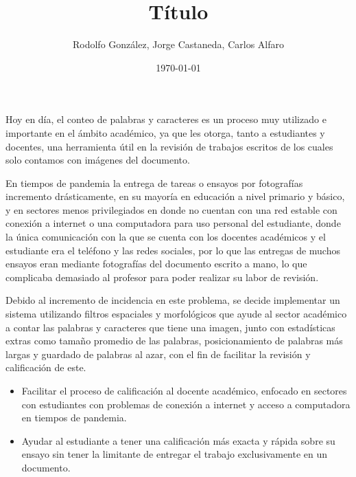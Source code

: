 \documentclass[11pt,a4paper]{markdown}
\author{ Rodolfo González, Jorge Castaneda, Carlos Alfaro}
\title{Título}
\date{\today}
\begin{document}
    \maketitle

   


\quad Hoy en día, el conteo de palabras y caracteres es un proceso muy utilizado e importante en el ámbito académico, ya que les otorga, tanto a estudiantes y docentes, una herramienta útil en la revisión de trabajos escritos de los cuales solo contamos con imágenes del documento. 

\quad En tiempos de pandemia la entrega de tareas o ensayos por fotografías incremento drásticamente, en su mayoría en educación a nivel primario y básico, y en sectores menos privilegiados en donde no cuentan con una red estable con conexión a internet o una computadora para uso personal del estudiante, donde la única comunicación con la que se cuenta con los docentes académicos y el estudiante era el teléfono y las redes sociales, por lo que las entregas de muchos ensayos eran mediante fotografías del documento escrito a mano, lo que complicaba demasiado al profesor para poder realizar su labor de revisión.

\quad Debido al incremento de incidencia en este problema, se decide implementar un sistema utilizando filtros espaciales y morfológicos que ayude al sector académico a contar las palabras y caracteres que tiene una imagen, junto con estadísticas extras como tamaño promedio de las palabras, posicionamiento de palabras más largas y guardado de palabras al azar, con el fin de facilitar la revisión y calificación de este.


\begin{itemize}
  \item Facilitar el proceso de calificación al docente académico, enfocado en sectores con estudiantes con problemas de conexión a internet y acceso a computadora en tiempos de pandemia.
  \item Ayudar al estudiante a tener una calificación más exacta y rápida sobre su ensayo sin tener la limitante de entregar el trabajo exclusivamente en un documento.
\end{itemize}

\end{document}
